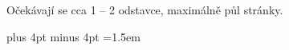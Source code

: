 \documentclass[11pt,twoside,a4paper]{book}   %
\begin{document}
\noindent
Očekávají se cca 1 -- 2 odstavce, maximálně půl stránky.


\tableofcontents



\listoffigures



\listoftables

\mainbodystarts
\parskip=5pt plus 4pt minus 4pt
\parindent=1.5em









\end{document}
